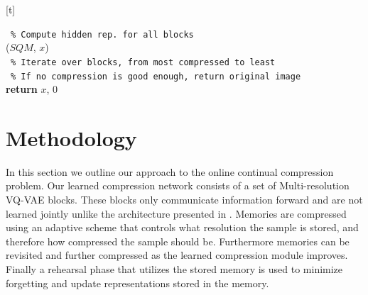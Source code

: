 \documentclass[colorinlistoftodos]{article} %
\begin{document}
\begin{minipage}{\textwidth}[t]
\begin{minipage}{0.50\textwidth}
\begin{algorithm2e}[H]
 \,\,\,\texttt{\% Compute hidden rep. for all blocks} \\
 ($SQM$, $x$)\\
\,\,\,\texttt{\% Iterate over blocks, from most compressed to least}\\
\,\,\,\texttt{\% If no compression is good enough, return original image} \\
\textbf{return} $x$, 0
\caption{}
\label{algo:adapcomp}
\end{algorithm2e}
\end{minipage}
\end{minipage}

\section{Methodology}
In this section we outline our approach to the online continual compression problem. Our learned compression network consists of a set of Multi-resolution VQ-VAE blocks. These blocks only communicate information forward and are not learned jointly unlike the architecture presented in \cite{razavi2019generating}. Memories are compressed using an adaptive scheme that controls what resolution the sample is stored, and therefore how compressed the sample should be. Furthermore memories can be revisited and further compressed as the learned compression module improves. Finally a rehearsal phase that utilizes the stored memory is used to minimize forgetting and update representations stored in the memory. 
\end{document}
